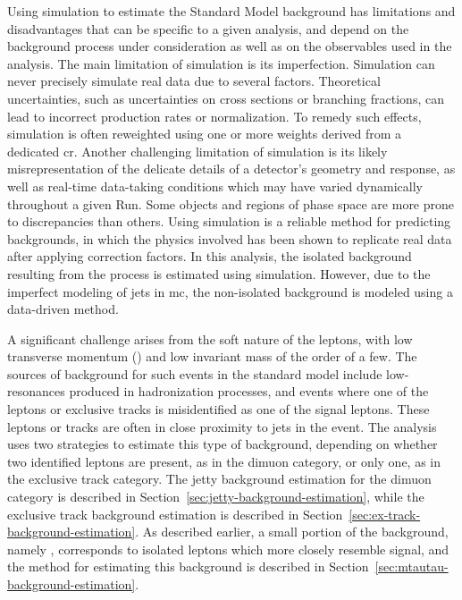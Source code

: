 Using simulation to estimate the Standard Model background has limitations and disadvantages that can be specific to a given analysis, and depend on the background process under consideration as well as on the observables used in the analysis. The main limitation of simulation is its imperfection. Simulation can never precisely simulate real data due to several factors. Theoretical uncertainties, such as uncertainties on cross sections or branching fractions, can lead to incorrect production rates or normalization. To remedy such effects, simulation is often reweighted using one or more weights derived from a dedicated \gls{cr}. Another challenging limitation of simulation is its likely misrepresentation of the delicate details of a detector’s geometry and response, as well as real-time data-taking conditions which may have varied dynamically throughout a given Run. Some objects and regions of phase space are more prone to discrepancies than others. Using simulation is a reliable method for predicting backgrounds, in which the physics involved has been shown to replicate real data after applying correction factors. In this analysis, the isolated background resulting from the \ztautau process is estimated using simulation. However, due to the imperfect modeling of jets in \gls{mc}, the non-isolated background is modeled using a data-driven method.

A significant challenge arises from the soft nature of the leptons, with low transverse momentum (\pt) and low invariant mass of the order of a few\GeV. The sources of background for such events in the standard model include low-\pt resonances produced in hadronization processes, and events where one of the leptons or exclusive tracks is misidentified as one of the signal leptons. These leptons or tracks are often in close proximity to jets in the event. The analysis uses two strategies to estimate this type of background, depending on whether two identified leptons are present, as in the dimuon category, or only one, as in the exclusive track category. The jetty background estimation for the dimuon category is described in Section~\ref{sec:jetty-background-estimation}, while the exclusive track background estimation is described in Section~\ref{sec:ex-track-background-estimation}. As described earlier, a small portion of the background, namely \ztautau, corresponds to isolated leptons which more closely resemble signal, and the method for estimating this background is described in Section~\ref{sec:mtautau-background-estimation}.

\clearpage
